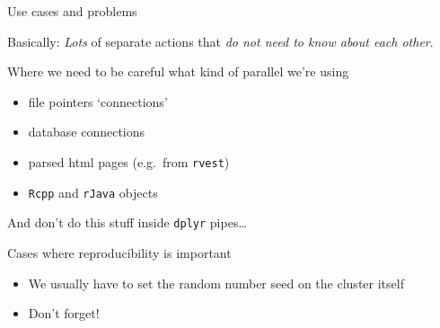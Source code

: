 \documentclass{hertieteaching}
\begin{document}
%
%
\begin{frame}{Use cases and problems}
  
Basically: \emph{Lots} of separate actions that \emph{do not need to
know about each other}.

\pause

Where we need to be careful what kind of parallel we're using

\begin{itemize}
\item
  file pointers `connections'
\item
  database connections
\item
  parsed html pages (e.g.~from \texttt{rvest})
\item
  \texttt{Rcpp} and \texttt{rJava} objects
\end{itemize}

And don't do this stuff inside \texttt{dplyr}
pipes\ldots{}

Cases where reproducibility is important
\begin{itemize}
  \item We usually have to set the random number seed on the cluster itself
  \item Don't forget!
\end{itemize}
\end{frame}
\end{document}
